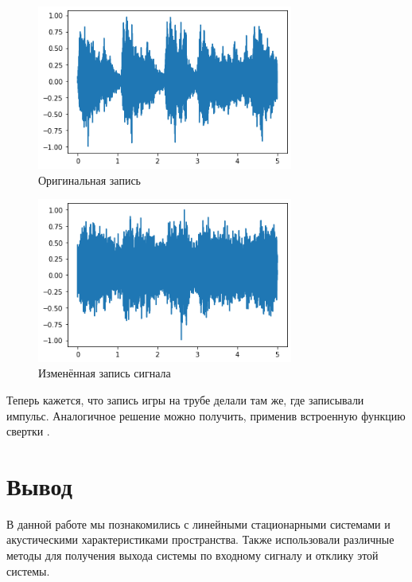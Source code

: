 \documentclass[a4paper, 12pt]{report}
\begin{document}
	\begin{figure}[H]
		\centering
		\includegraphics[width=0.75\textwidth]{task13.png}
		\caption{Оригинальная запись}
		\label{fig:task13}
	\end{figure}
	\begin{figure}[H]
		\centering
		\includegraphics[width=0.75\textwidth]{task14.png}
		\caption{Изменённая запись сигнала}
		\label{fig:task14}
	\end{figure}
	Теперь кажется, что запись игры на трубе делали там же, где записывали импульс. Аналогичное решение можно получить, применив встроенную функцию свертки .

	\chapter{Вывод}
	В данной работе мы познакомились с линейными стационарными системами и акустическими характеристиками пространства. Также использовали различные методы для получения выхода системы по входному сигналу и отклику этой системы.
\end{document}
